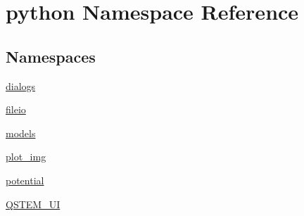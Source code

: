 \hypertarget{namespacepython}{\section{python Namespace Reference}
\label{namespacepython}
}
\subsection*{Namespaces}
\begin{DoxyCompactItemize}
\item 
\hyperlink{namespacepython_1_1dialogs}{dialogs}
\item 
\hyperlink{namespacepython_1_1fileio}{fileio}
\item 
\hyperlink{namespacepython_1_1models}{models}
\item 
\hyperlink{namespacepython_1_1plot__img}{plot\-\_\-img}
\item 
\hyperlink{namespacepython_1_1potential}{potential}
\item 
\hyperlink{namespacepython_1_1_q_s_t_e_m___u_i}{Q\-S\-T\-E\-M\-\_\-\-U\-I}
\end{DoxyCompactItemize}
